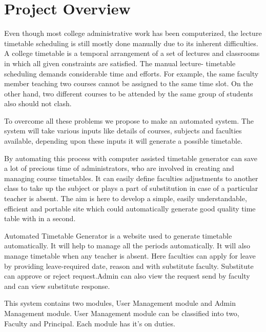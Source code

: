 \section{Project Overview}

Even though most college administrative work has been computerized, the lecture timetable scheduling is still mostly done manually due to its inherent difficulties. A college timetable is a temporal arrangement of a set of lectures and classrooms in which all given constraints are satisfied. The manual lecture- timetable scheduling demands considerable time and efforts. For example, the same faculty member teaching two courses cannot be assigned to the same time slot. On the other hand, two different courses to be attended by the same group of students also should not clash.


          To overcome all these problems we propose to make an automated system. The system will take various inputs like details of courses, subjects and faculties available, depending upon these inputs it will generate a possible timetable.

               By automating this process with computer assisted timetable generator can save a lot of precious time of administrators, who are involved in creating and managing course timetables. It can easily define faculties adjustments to another class to take up the subject or plays a part of substitution in case of a particular teacher is absent. The aim is here to develop a simple, easily understandable, efficient and portable site which could automatically generate good quality time table with in a second.


                  Automated Timetable Generator is a website used to generate timetable automatically. It will help to manage all the periods automatically. It will also manage timetable when any teacher is absent. Here faculties can apply for leave by providing leave-required date, reason and with substitute faculty. Substitute can approve or reject request.Admin can also view the request send by faculty and can view substitute response.  


		This system contains two modules, User Management module and Admin Management module. User Management module can be classified into two, Faculty and Principal. Each module has it's on duties.

